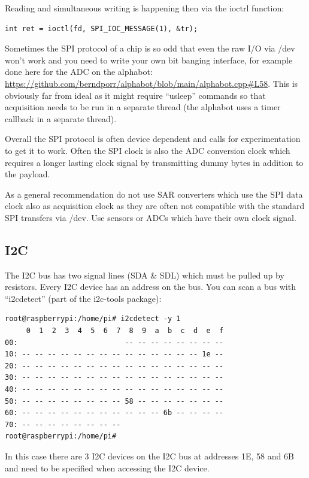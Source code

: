 \documentclass[12pt]{report}
\begin{document}
Reading and simultaneous writing is happening then via the ioctrl
function:
\begin{verbatim}
int ret = ioctl(fd, SPI_IOC_MESSAGE(1), &tr);
\end{verbatim}

Sometimes the SPI protocol of a chip is so odd that even the raw
I/O via /dev won't work and you need to write your own bit banging
interface, for example done here for the ADC on the alphabot:
\url{https://github.com/berndporr/alphabot/blob/main/alphabot.cpp#L58}.
This is obviously far from ideal as it might require ``usleep'' commands
so that acquisition needs to be run in a separate thread (the alphabot
uses a timer callback in a separate thread).

Overall the SPI protocol is often device dependent and calls
for experimentation to get it to work. Often the SPI clock is also
the ADC conversion clock which requires a longer lasting clock signal
by transmitting dummy bytes in addition to the payload.

As a general recommendation do not use SAR converters which use the
SPI data clock also as acquisition clock as they are often not compatible
with the standard SPI transfers via /dev. Use sensors or ADCs which
have their own clock signal.


\subsection{I2C}
The I2C bus has two signal lines (SDA \& SDL) which must be pulled up
by resistors. Every I2C device has an address on the bus. You can scan
a bus with ``i2cdetect'' (part of the i2c-tools package):
\begin{verbatim}
root@raspberrypi:/home/pi# i2cdetect -y 1
     0  1  2  3  4  5  6  7  8  9  a  b  c  d  e  f
00:                         -- -- -- -- -- -- -- -- 
10: -- -- -- -- -- -- -- -- -- -- -- -- -- -- 1e -- 
20: -- -- -- -- -- -- -- -- -- -- -- -- -- -- -- -- 
30: -- -- -- -- -- -- -- -- -- -- -- -- -- -- -- -- 
40: -- -- -- -- -- -- -- -- -- -- -- -- -- -- -- -- 
50: -- -- -- -- -- -- -- -- 58 -- -- -- -- -- -- -- 
60: -- -- -- -- -- -- -- -- -- -- -- 6b -- -- -- -- 
70: -- -- -- -- -- -- -- --                         
root@raspberrypi:/home/pi# 
\end{verbatim}
In this case there are 3 I2C devices on the I2C bus at addresses
1E, 58 and 6B and need to be specified when
accessing the I2C device.
\end{document}
